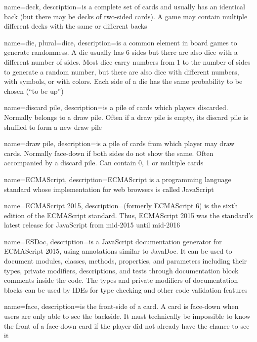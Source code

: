 
{
  name=deck,
  description={is a complete set of cards and usually has an identical
  back (but there may be decks of two-sided cards). A game may contain
  multiple different decks with the same or different backs}
}

{
  name=die,
  plural=dice,
  description={is a common element in board games to generate randomness. A die
  usually has 6 sides but there are also dice with a different number of sides.
  Most dice carry numbers from 1 to the number of sides to generate a random
  number, but there are also dice with different numbers, with symbols, or with
  colors. Each side of a die has the same probability to be chosen (“to be
  up”)}
}

{
  name=discard pile,
  description={is a pile of cards which players discarded. Normally belongs to
  a draw pile. Often if a draw pile is empty, its discard pile is shuffled to
  form a new draw pile}
}

{
  name=draw pile,
  description={is a pile of cards from which player may draw cards. Normally
  face-down if both sides do not show the same. Often accompanied by a
  discard pile. Can contain 0, 1 or multiple cards}
}

{
  name=ECMAScript,
  description={ECMAScript is a programming language standard whose
  implementation for web browsers is called JavaScript}
}


{
  name={ECMAScript 2015},
  description={(formerly ECMAScript 6) is the sixth edition of the
  \gls{ECMAScript} standard. Thus, ECMAScript 2015 was the standard's latest
  release for JavaScript from mid-2015 until mid-2016}
}


{
  name={ESDoc},
  description={is a JavaScript documentation generator for \gls{ECMAScript
  2015}, using annotations similar to JavaDoc. It can be used to document
  modules, classes, methods, properties, and parameters including their types,
  private modifiers, descriptions, and tests through documentation block comments inside
  the code. The types and private modifiers of documentation blocks can be used
  by \glspl{IDE} for type checking and other code validation features}
}

{
  name=face,
  description={is the front-side of a card. A card is face-down when users
  are only able to see the backside. It must technically be impossible to know
  the front of a face-down card if the player did not already have the chance
  to see it}
}

